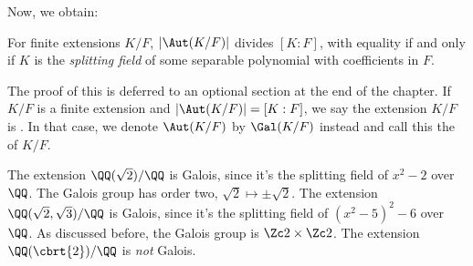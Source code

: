 Now, we obtain:
\begin{theorem}
	For finite extensions $K/F$,
	$\left\lvert \Aut(K/F) \right\rvert$ divides $[K:F]$,
	with equality if and only if $K$ is the \emph{splitting field}
	of some separable polynomial with coefficients in $F$.
	\label{thm:Galois_splitting}
\end{theorem}
The proof of this is deferred to an optional section at the end of the chapter.
If $K/F$ is a finite extension and $\left\lvert \Aut(K/F) \right\rvert = [K:F]$,
we say the extension $K/F$ is .
In that case, we denote $\Aut(K/F)$ by $\Gal(K/F)$ instead
and call this the  of $K/F$.

\begin{example}
	\listhack
	\begin{enumerate}[(a)]
		\ii The extension $\QQ(\sqrt2) / \QQ$ is Galois,
		since it's the splitting field of $x^2-2$ over $\QQ$.
		The Galois group has order two, $\sqrt 2 \mapsto \pm \sqrt 2$.
		\ii The extension $\QQ(\sqrt2, \sqrt 3) / \QQ$ is Galois,
		since it's the splitting field of $(x^2-5)^2-6$ over $\QQ$.
		As discussed before, the Galois group is $\Zc 2 \times \Zc 2$.
		\ii The extension $\QQ(\cbrt{2}) / \QQ$ is \emph{not} Galois.
	\end{enumerate}
\end{example}


